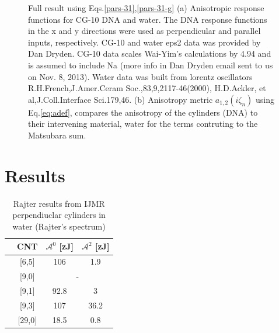 \documentclass[onecolumn,letterpaper,amsmath,amssymb,floatfix,aps,superscriptaddress]{revtex4}
\begin{document}
\begin{figure}[t!]
\begin{center}
\begin{minipage}[b]{0.40\textwidth}
\end{minipage}
\caption{Full result using Eqs.\ref{pars-31},\ref{pars-31-g} (a) Anisotropic response functions for CG-10 DNA and water. The DNA response functions in the x and y directions were used as perpendicular and parallel inputs, respectively.  CG-10 and water eps2 data was provided by Dan Dryden. CG-10 data scales Wai-Yim's calculations by 4.94 and is assumed to include Na (more info in Dan Dryden email sent to us on Nov. 8, 2013).  Water data was built from lorentz oscillators R.H.French,J.Amer.Ceram Soc.,83,9,2117-46(2000), H.D.Ackler, et al,J.Coll.Interface Sci.179,46.
(b) Anisotropy metric $a_{1,2}(i\zeta_n)$ using Eq.\ref{eq:adef}, compares the anisotropy of the  cylinders (DNA) to their intervening material, water for the terms contruting to the Matsubara sum.}
\label{eiz65}
\end{center}
\end{figure} 
\section{Results}

\begin{table}[ht]
\caption{Rajter results from IJMR perpendiuclar cylinders in water (Rajter's
spectrum)}
\centering
\begin{tabular}{l c|c|c}
  \hline  
  &\hspace{0.25in}CNT \hspace{0.25in}& \hspace{0.25in}$\mathcal{A}^{0}$    [zJ] \hspace{0.25in}& \hspace{0.25in}$\mathcal{A}^{2}$    [zJ] \hspace{0.25in}\\
  \hline\hline 
  &[6,5]  & 106 & 1.9 \\
  \hline
  &[9,0]  & \multicolumn{2}{c}{-}\\
  \hline
  &[9,1]  & 92.8 & 3 \\
  \hline
  &[9,3]  & 107 & 36.2 \\
  \hline
  &[29,0] & 18.5 & 0.8 \\
  \hline  
\end{tabular}
\label{table:nonlin}
\end{table}
\end{document}
